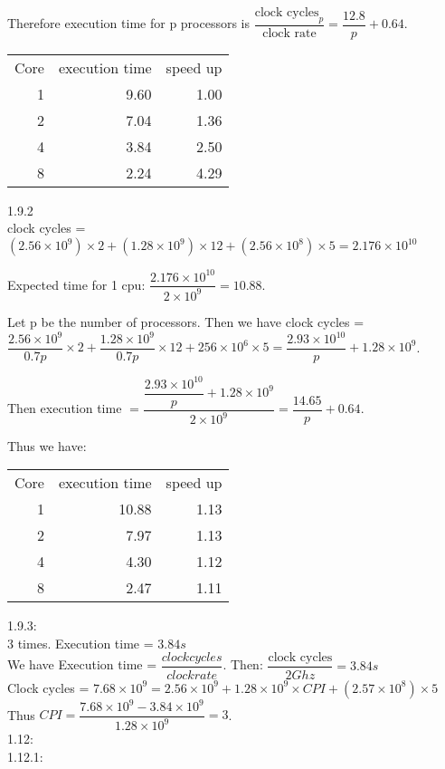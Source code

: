 \documentclass[12pt]{article}
\begin{document}
	Therefore execution time for p processors is $\dfrac{\text{clock cycles}_p}{\text{clock rate}} = \dfrac{12.8}{p}+0.64$.\\
	\begin{tabular}{rrr}
		Core &  execution time &  speed up \\
		1 &            9.60 &      1.00 \\
		2 &            7.04 &      1.36 \\
		4 &            3.84 &      2.50 \\
		8 &            2.24 &      4.29 \\
	\end{tabular}
	
	1.9.2\\
	clock cycles = $(2.56 \times 10 ^9) \times 2 + (1.28 \times 10^9) \times 12 + (2.56 \times 10^8) \times 5 = 2.176 \times 10^{10}$
	
	Expected time for 1 cpu: $\dfrac{2.176 \times 10^{10}}{2 \times 10 ^9} = 10.88$.
	
	Let p be the number of processors. Then we have clock cycles = $\dfrac{2.56 \times 10^9}{0.7p} \times 2 + \dfrac{1.28 \times 10^9}{0.7p}\times 12 + 256 \times 10^6 \times 5 = \dfrac{2.93 \times 10^{10}}{p}+1.28 \times 10^9$.
	
	Then execution time $= \dfrac{\dfrac{2.93 \times 10^{10}}{p}+1.28 \times 10^9}{2 \times 10^9} = \dfrac{14.65}{p}+0.64$.
	
	Thus we have:
	\begin{tabular}{rrr}
	
		Core &  execution time &  speed up \\
	
		1 &           10.88 &      1.13 \\
		2 &            7.97 &      1.13 \\
		4 &            4.30 &      1.12 \\
		8 &            2.47 &      1.11 \\
	
	\end{tabular}
	
	1.9.3:\\
	3 times.
	Execution time = $3.84s$\\
	We have Execution time = $\dfrac{clock cycles}{clock rate}$.
	Then:
	$\dfrac{\text{clock cycles}}{2Ghz} = 3.84s$\\
	Clock cycles = $7.68 \times 10^9 = 2.56 \times 10^9 + 1.28 \times 10^9 \times CPI + (2.57 \times 10^8)\times 5$
	Thus $CPI = \dfrac{7.68 \times 10^9 -3.84 \times 10^9}{1.28 \times 10^9} = 3$.\\
	1.12:\\
	1.12.1: 
	
\end{document}
